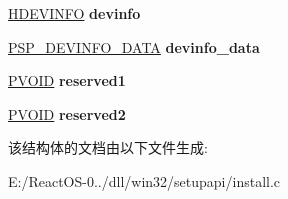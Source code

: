 \begin{DoxyCompactItemize}
\mbox{\label{structneeds__callback__info_a00e922940e4965db0d79c9a8533060f4}} 
\hyperlink{interfacevoid}{H\+D\+E\+V\+I\+N\+FO} {\bfseries devinfo}
\item 
\mbox{\label{structneeds__callback__info_adffd0f294ea063a92aaf881106c9ea37}} 
\hyperlink{struct___s_p___d_e_v_i_n_f_o___d_a_t_a}{P\+S\+P\+\_\+\+D\+E\+V\+I\+N\+F\+O\+\_\+\+D\+A\+TA} {\bfseries devinfo\+\_\+data}
\item 
\mbox{\label{structneeds__callback__info_a5bf385729fd61ae0a2fc3552c9eb3b78}} 
\hyperlink{interfacevoid}{P\+V\+O\+ID} {\bfseries reserved1}
\item 
\mbox{\label{structneeds__callback__info_a5d41a494fc89cd6fbbe08025ab5d237f}} 
\hyperlink{interfacevoid}{P\+V\+O\+ID} {\bfseries reserved2}
\end{DoxyCompactItemize}


该结构体的文档由以下文件生成\+:\begin{DoxyCompactItemize}
\item 
E\+:/\+React\+O\+S-\/0../dll/win32/setupapi/install.\+c\end{DoxyCompactItemize}
